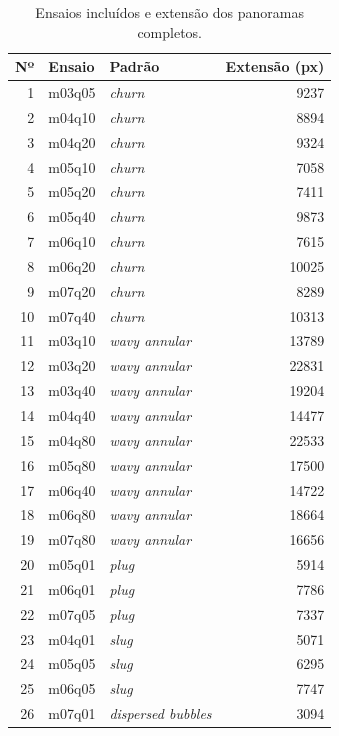 \begin{table}[!htbp]
  \centering
  \begin{threeparttable}
  \caption{Ensaios incluídos e extensão dos panoramas completos.}
  \label{tab:res-ensaios}
  \small
  \renewcommand{\arraystretch}{0.98}
  \begin{tabular*}{\textwidth}{@{\extracolsep{\fill}}r l l r@{}}
    \hline
    \textbf{Nº} & \textbf{Ensaio} & \textbf{Padrão} & \textbf{Extensão (px)}\\
    \hline
    1 & m03q05 & \textit{churn} & 9237\\
    2 & m04q10 & \textit{churn} & 8894\\
    3 & m04q20 & \textit{churn} & 9324\\
    4 & m05q10 & \textit{churn} & 7058\\
    5 & m05q20 & \textit{churn} & 7411\\
    6 & m05q40 & \textit{churn} & 9873\\
    7 & m06q10 & \textit{churn} & 7615\\
    8 & m06q20 & \textit{churn} & 10025\\
    9 & m07q20 & \textit{churn} & 8289\\
    10 & m07q40 & \textit{churn} & 10313\\
    \hline
    11 & m03q10 & \textit{wavy annular} & 13789\\
    12 & m03q20 & \textit{wavy annular} & 22831\\
    13 & m03q40 & \textit{wavy annular} & 19204\\
    14 & m04q40 & \textit{wavy annular} & 14477\\
    15 & m04q80 & \textit{wavy annular} & 22533\\
    16 & m05q80 & \textit{wavy annular} & 17500\\
    17 & m06q40 & \textit{wavy annular} & 14722\\
    18 & m06q80 & \textit{wavy annular} & 18664\\
    19 & m07q80 & \textit{wavy annular} & 16656\\
    \hline
    20 & m05q01 & \textit{plug} & 5914\\
    21 & m06q01 & \textit{plug} & 7786\\
    22 & m07q05 & \textit{plug} & 7337\\
    23 & m04q01 & \textit{slug} & 5071\\
    24 & m05q05 & \textit{slug} & 6295\\
    25 & m06q05 & \textit{slug} & 7747\\
    26 & m07q01 & \textit{dispersed bubbles} & 3094\\
    \hline
  \end{tabular*}
  \end{threeparttable}
\end{table}

